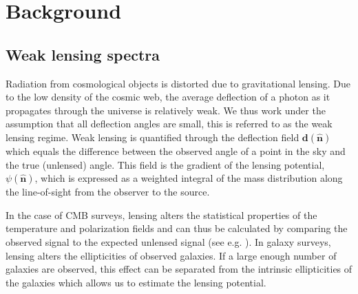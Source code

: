\documentclass[11pt]{article} %
\begin{document}
\section{Background}
\label{sec:theory}
\subsection{Weak lensing spectra}
Radiation from cosmological objects is distorted due to gravitational lensing. Due to the low density of the cosmic web, the average deflection of a photon as it propagates through the universe is relatively weak. We thus work under the assumption that all deflection angles are small, this is referred to as the weak lensing regime. Weak lensing is quantified through the deflection field $\mathbf d(\hat {\mathbf n})$ which equals the difference between the observed angle of a point in the sky and the true (unlensed) angle. This field is the gradient of the lensing potential, $\psi(\hat {\mathbf n})$, which is expressed as a weighted integral of the mass distribution along the line-of-sight from the observer to the source.

In the case of CMB surveys, lensing alters the statistical properties of the temperature and polarization fields and can thus be calculated by comparing the observed signal to the expected unlensed signal (see e.g. \cite{Maniyar2021_QE_CMBLensing, Hirata_2003}). In galaxy surveys, lensing alters the ellipticities of observed galaxies. If a large enough number of galaxies are observed, this effect can be separated from the intrinsic ellipticities of the galaxies which allows us to estimate the lensing potential.
\end{document}
